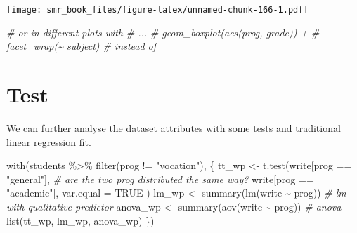 \documentclass[
  oneside]{book}
\newenvironment{Shaded}{\begin{snugshade}}{\end{snugshade}}
\newcommand{\AttributeTok}[1]{\textcolor[rgb]{0.77,0.63,0.00}{#1}}
\newcommand{\CommentTok}[1]{\textcolor[rgb]{0.56,0.35,0.01}{\textit{#1}}}
\newcommand{\ConstantTok}[1]{\textcolor[rgb]{0.00,0.00,0.00}{#1}}
\newcommand{\FunctionTok}[1]{\textcolor[rgb]{0.00,0.00,0.00}{#1}}
\newcommand{\NormalTok}[1]{#1}
\newcommand{\OtherTok}[1]{\textcolor[rgb]{0.56,0.35,0.01}{#1}}
\newcommand{\SpecialCharTok}[1]{\textcolor[rgb]{0.00,0.00,0.00}{#1}}
\newcommand{\StringTok}[1]{\textcolor[rgb]{0.31,0.60,0.02}{#1}}
\begin{document}
\texttt{[image: smr\_book\_files/figure-latex/unnamed-chunk-166-1.pdf]}

\begin{Shaded}
\begin{Highlighting}[]
\CommentTok{\# or in different plots with}
\CommentTok{\#    ...}
\CommentTok{\#    geom\_boxplot(aes(prog, grade)) +}
\CommentTok{\#    facet\_wrap(\textasciitilde{} subject) \# instead of}
\end{Highlighting}
\end{Shaded}

\hypertarget{test}{%
\section{Test}\label{test}}

We can further analyse the dataset attributes with some tests and
traditional linear regression fit.

\begin{Shaded}
\begin{Highlighting}[]
\FunctionTok{with}\NormalTok{(students }\SpecialCharTok{\%\textgreater{}\%} \FunctionTok{filter}\NormalTok{(prog }\SpecialCharTok{!=} \StringTok{"vocation"}\NormalTok{), \{}
\NormalTok{  tt\_wp }\OtherTok{\textless{}{-}} \FunctionTok{t.test}\NormalTok{(write[prog }\SpecialCharTok{==} \StringTok{"general"}\NormalTok{], }\CommentTok{\# are the two prog distributed the same way?}
\NormalTok{    write[prog }\SpecialCharTok{==} \StringTok{"academic"}\NormalTok{],}
    \AttributeTok{var.equal =} \ConstantTok{TRUE}
\NormalTok{  )}
\NormalTok{  lm\_wp }\OtherTok{\textless{}{-}} \FunctionTok{summary}\NormalTok{(}\FunctionTok{lm}\NormalTok{(write }\SpecialCharTok{\textasciitilde{}}\NormalTok{ prog)) }\CommentTok{\# lm with qualitative predictor}
\NormalTok{  anova\_wp }\OtherTok{\textless{}{-}} \FunctionTok{summary}\NormalTok{(}\FunctionTok{aov}\NormalTok{(write }\SpecialCharTok{\textasciitilde{}}\NormalTok{ prog)) }\CommentTok{\# anova}
  \FunctionTok{list}\NormalTok{(tt\_wp, lm\_wp, anova\_wp)}
\NormalTok{\})}
\end{Highlighting}
\end{Shaded}
\end{document}
